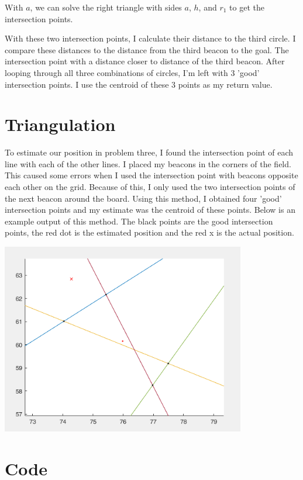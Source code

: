 \documentclass[12pt]{article}
\begin{document}
	\noindent With $a$, we can solve the right triangle with sides $a$, $h$, and $r_1$ to get the intersection points.
	
	With these two intersection points, I calculate their distance to the third circle. I compare these distances to the distance from the third beacon to the goal. The intersection point with a distance closer to distance of the third beacon. After looping through all three combinations of circles, I'm left with 3 'good' intersection points. I use the centroid of these 3 points as my return value.
	
	\section{Triangulation}

	To estimate our position in problem three, I found the intersection point of each line with each of the other lines. I placed my beacons in the corners of the field. This caused some errors when I used the intersection point with beacons opposite each other on the grid. Because of this, I only used the two intersection points of the next beacon around the board. Using this method, I obtained four 'good' intersection points and my estimate was the centroid of these points. Below is an example output of this method. The black points are the good intersection points, the red dot is the estimated position and the red x is the actual position.
	
	\begin{center}\includegraphics[width=0.8\textwidth]{p3ex}\end{center}
	
	\pagebreak
	
	\section{Code}
	
	
	
	\pagebreak
	
	
	
	\pagebreak
	
	
\end{document}

